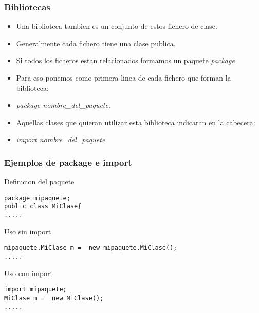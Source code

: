 \documentclass{beamer}
\begin{document}
\begin{frame}[fragile]
    \frametitle{Bibliotecas}

\begin{itemize}[<+-| alert@+>]
      \item Una biblioteca tambien es un conjunto de estos fichero de clase.
      \item Generalmente cada fichero tiene una clase publica.
      \item Si todos los ficheros estan relacionados formamos un paquete \emph{package}
      \item Para eso ponemos como primera linea de cada fichero que forman la biblioteca:
      \item \emph{package nombre\_del\_paquete}.
      \item Aquellas clases que quieran utilizar esta biblioteca indicaran en la cabecera:
      \item \emph{import nombre\_del\_paquete}
    \end{itemize}
\end{frame}
\begin{frame}[fragile]
\frametitle{Ejemplos de package e import}
\begin{block}{Definicion del paquete}

    \begin{verbatim}
package mipaquete;
public class MiClase{ 
.....
\end{verbatim}
\end{block}

\pause
\begin{exampleblock}{Uso sin import}
\begin{verbatim}
mipaquete.MiClase m =  new mipaquete.MiClase();
.....
\end{verbatim}
\end{exampleblock}
\begin{alertblock}{Uso con import}

\pause
\begin{verbatim}
import mipaquete;
MiClase m =  new MiClase();
.....
\end{verbatim}
\end{alertblock}

\end{frame}
\end{document}
